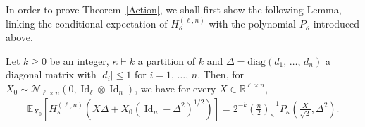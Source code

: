 \documentclass[AHL,Unicode,longabstracts,published]{cedram}
\DeclareMathOperator{\Id}{Id}
\newcommand{\scN}{\mathscr{N}}
\newcommand{\diag}{\mathrm{diag}}
\newcommand{\R}{\mathbb{R}}
\newcommand{\EX}[2]{\mathbb{E}_{#1}\left[#2\right]}
\begin{document}
In order to prove Theorem~\ref{Action}, we shall first show the following Lemma, linking the conditional expectation of $H_{\kappa}^{(\ell,n)}$ with the polynomial $P_{\kappa}$ introduced above.

\begin{lemm}
Let $k\geq 0$ be an integer, $\kappa\vdash k$ a partition of $k$ and $\Delta=\diag(d_1,\,\ldots,\,d_n)$ a diagonal matrix with $|d_i|\leq 1$ for $i=1,\,\ldots,\,n$. Then, for $X_0 \sim \scN_{\ell\times n}(0,\Id_{\ell}\otimes \Id_n)$, we have for every $X \in \R^{\ell \times n}$,
\begin{gather}\label{Aux}
\EX{X_0}{H_{\kappa}^{(\ell,n)}\left(X\Delta+X_0\left(\Id_n-\Delta^2\right)^{1/2}\right) } = 2^{-k}\left(\frac{n}{2}\right)_{\kappa}^{-1} P_{\kappa}\left(\frac{X}{\sqrt{2}},\Delta^2\right).
\end{gather}
\end{lemm}
\end{document}
